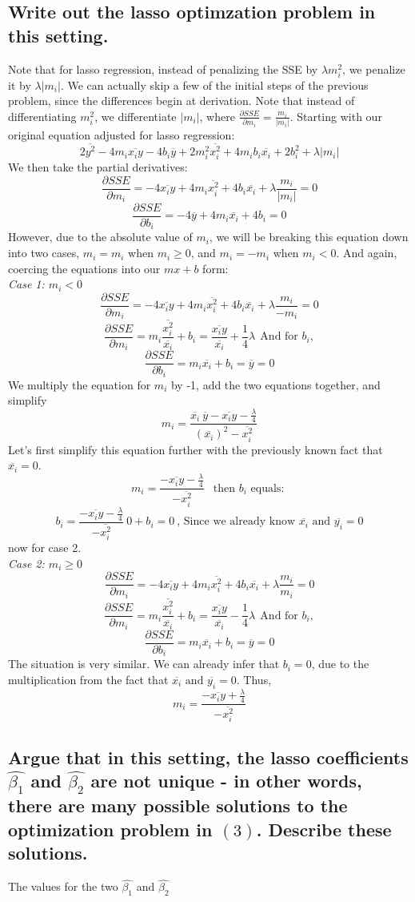 \documentclass[20pt]{article} %
\begin{document}
\newpage
\subsection{Write out the lasso optimzation problem in this setting.}
Note that for lasso regression, instead of penalizing the SSE by $\lambda m_i^{2}$, we penalize it by $\lambda |m_i|$.  We can actually skip a few of the initial steps of the previous problem, since the differences begin at derivation.  Note that instead of differentiating $m_i^{2}$, we differentiate $|m_i|$, where $\frac{\partial SSE}{\partial m_i} = \frac{m_i}{|m_i|}$. Starting with our original equation adjusted for lasso regression:
$$2\overline{y^{2}} - 4m_i\overline{x_iy} - 4b_i\overline{y} + 2m_i^{2}\overline{x_i^{2}} + 4m_ib_i\overline{x_i} + 2b_i^{2} + \lambda |m_i|$$
We then take the partial derivatives:
$$\frac{\partial SSE}{\partial m_i} = -4\overline{x_iy} + 4m_i\overline{x_i^{2}} + 4b_i\overline{x_i} +  \lambda \frac{m_i}{|m_i|} = 0$$
$$\frac{\partial SSE}{\partial b_i} = -4\overline{y} + 4 m_i \overline{x_i} + 4b_i = 0$$
However, due to the absolute value of $m_i$, we will be breaking this equation down into two cases, $m_i = m_i$ when $m_i \geq 0$, and $m_i = -m_i$ when $m_i < 0$.  And again, coercing the equations into our $mx+b$ form: \\
\textit{Case 1: $m_i < 0$}
$$\frac{\partial SSE}{\partial m_i} = -4\overline{x_iy} + 4m_i\overline{x_i^{2}} + 4b_i\overline{x_i} +  \lambda \frac{m_i}{-m_i} = 0$$
$$\frac{\partial SSE}{\partial m_i} =m_i \frac{\overline{x_i^{2}}}{\overline{x_i}} + b_i =  \frac{\overline{x_iy}}{\overline{x_i}} +  \frac{1}{4}\lambda \ \ \text{And for } b_i,$$
$$\frac{\partial SSE}{\partial b_i} = m_i \overline{x_i} + b_i = \overline{y} = 0$$
We multiply the equation for $m_i$ by -1, add the two equations together, and simplify
$$m_i = \frac{ \overline{x_i} \ \overline{y} - \overline{x_iy} - \frac{\lambda}{4}}{( \overline{x_i} )^{2} - \overline{x_i^{2}}}$$
Let's first simplify this equation further with the previously known fact that $\overline{x_i} = 0$.
$$m_i = \frac{- \overline{x_iy} - \frac{\lambda}{4}}{- \overline{x_i^{2}}} \ \ \text{ then } b_i \text{ equals: }$$
$$b_i = \frac{- \overline{x_iy} - \frac{\lambda}{4}}{- \overline{x_i^{2}}} \ 0 + b_i = 0 \ \text{, Since we already know } \overline{x_i} \text{ and } \overline{y_i} = 0$$
now for case 2. \\
\textit{Case 2: $m_i \geq 0$}
$$\frac{\partial SSE}{\partial m_i} = -4\overline{x_iy} + 4m_i\overline{x_i^{2}} + 4b_i\overline{x_i} +  \lambda \frac{m_i}{m_i} = 0$$
$$\frac{\partial SSE}{\partial m_i} =m_i \frac{\overline{x_i^{2}}}{\overline{x_i}} + b_i =  \frac{\overline{x_iy}}{\overline{x_i}} -  \frac{1}{4}\lambda \ \ \text{And for } b_i,$$
$$\frac{\partial SSE}{\partial b_i} = m_i \overline{x_i} + b_i = \overline{y} = 0$$
The situation is very similar. We can already infer that $b_i = 0$, due to the multiplication from the fact that $\overline{x_i} \text{ and } \overline{y_i} = 0$. Thus,
$$m_i = \frac{- \overline{x_iy} + \frac{\lambda}{4}}{- \overline{x_i^{2}}}$$
\subsection{Argue that in this setting, the lasso coefficients $\hat{\beta_1}$ and $\hat{\beta_2}$ are not unique - in other words, there are many possible solutions to the optimization problem in $(3)$. Describe these solutions.}
The values for the two $\hat{\beta_1}$ and $\hat{\beta_2}$
\end{document}
